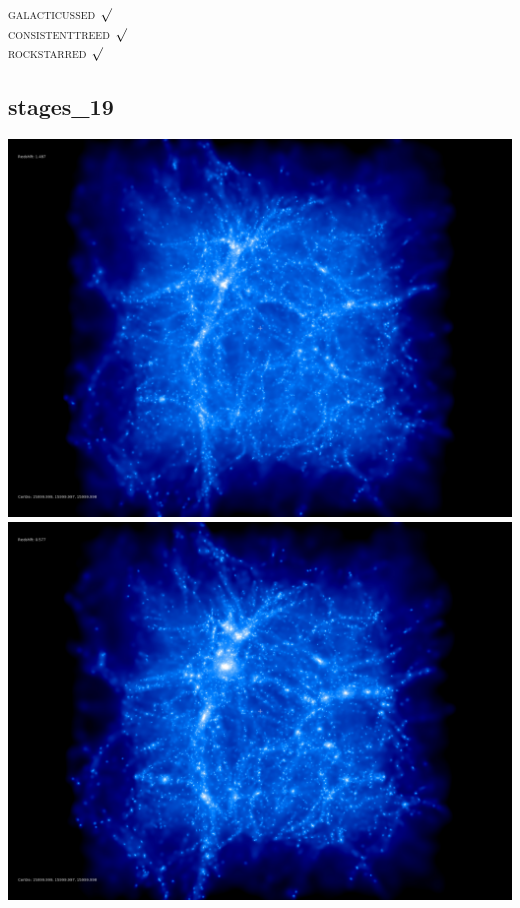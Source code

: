 \textsc{galacticussed} $\surd$ \\
\textsc{consistenttreed} $\surd$ \\ 
\textsc{rockstarred} $\surd$

% 
%
%
%
%
%
%
%

\newpage
\subsection{stages\_19}

\includegraphics[scale=0.1]{r256/stages_19/50.jpg} 
\includegraphics[scale=0.1]{r256/stages_19/100.jpg}  \\

